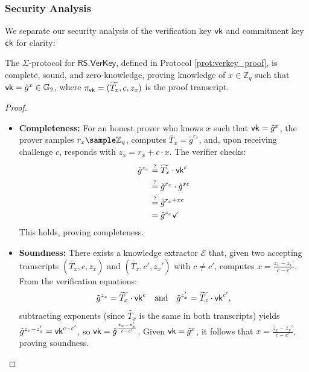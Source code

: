 \subsubsection{Security Analysis}
We separate our security analysis of the verification key $\mathsf{vk}$ and commitment key $\mathsf{ck}$ for clarity:

\begin{theorem}
    The $\Sigma$-protocol for $\mathsf{RS.VerKey}$, defined in Protocol \ref{prot:verkey_proof}, is complete, sound, and zero-knowledge, proving knowledge of $x \in \mathbb{Z}_q$ such that $\mathsf{vk} = \tilde{g}^x \in \mathbb{G}_2$, where $\pi_{\mathsf{vk}} = (\widetilde{T_{x}}, c, z_x)$ is the proof transcript.
\end{theorem}

\begin{proof}
    \begin{itemize}
        \item \textbf{Completeness:} For an honest prover who knows $x$ such that $\mathsf{vk} = \tilde{g}^x$, the prover samples $r_x \sample \mathbb{Z}_q$, computes $\widetilde{T_{x}} = \tilde{g}^{r_x}$, and, upon receiving challenge $c$, responds with $z_x = r_x + c \cdot x$. The verifier checks:
    \begin{align*}
        \tilde{g}^{z_x} &\stackrel{?}{=} \widetilde{T_{x}} \cdot \mathsf{vk}^c \\
        &\stackrel{?}{=} \tilde{g}^{r_x} \cdot \tilde{g}^{xc} \\
        &\stackrel{?}{=} \tilde{g}^{r_x + xc}\\
        &=\tilde{g}^{z_x} \checkmark
    \end{align*} 
    This holds, proving completeness.

        \item \textbf{Soundness:} There exists a knowledge extractor $\mathcal{E}$ that, given two accepting transcripts $(\widetilde{T_{x}}, c, z_x)$ and $(\widetilde{T_{x}}, c', z_x')$ with $c \neq c'$, computes $x = \frac{z_x - z_x'}{c - c'}$. From the verification equations:
        \[
        \tilde{g}^{z_x} = \widetilde{T_{x}} \cdot \mathsf{vk}^c \quad \text{and} \quad \tilde{g}^{z_x'} = \widetilde{T_{x}} \cdot \mathsf{vk}^{c'},
        \]
        subtracting exponents (since $\widetilde{T_{x}}$ is the same in both transcripts) yields $\tilde{g}^{z_x - z_x'} = \mathsf{vk}^{c - c'}$, so $\mathsf{vk} = \tilde{g}^{\frac{z_x - z_x'}{c - c'}}$. Given $\mathsf{vk} = \tilde{g}^x$, it follows that $x = \frac{z_x - z_x'}{c - c'}$, proving soundness.


\end{itemize}
\end{proof}
